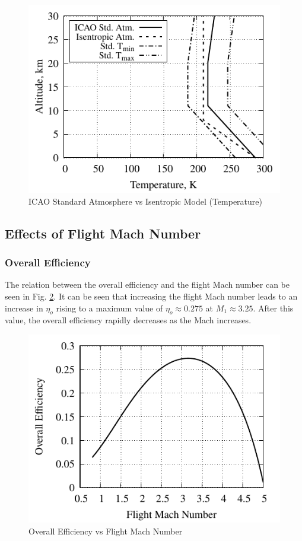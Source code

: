 \documentclass[conf]{new-aiaa} %
\begin{document}
\begin{figure}[H] %
    \centering
    \includegraphics[]{media/atmosphere_validation_files/ICAO_vs_ISEN_temperature.pdf}
    \caption{\label{fig:partbtemp}ICAO Standard Atmosphere vs Isentropic Model (Temperature)}
\end{figure}

\subsection{Effects of Flight Mach Number} %
\subsubsection{Overall Efficiency}
The relation between the overall efficiency and the flight Mach number can be seen in Fig. \ref{fig:partcetao}. It can be seen that increasing the flight Mach number leads to an increase in $\eta_o$ rising to a maximum value of $\eta_o\approx0.275$ at $M_1\approx3.25$. After this value, the overall efficiency rapidly decreases as the Mach increases.

\begin{figure}[H] %
    \centering
    \includegraphics[]{media/performance_parameter_files/part_c_eta_o.pdf}
    \caption{\label{fig:partcetao}Overall Efficiency vs Flight Mach Number}
\end{figure}
\end{document}
